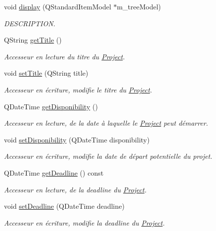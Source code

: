 \begin{DoxyCompactItemize}
void \hyperlink{class_project_abaf715709bc3997c7bee420be44ce608}{display} (Q\+Standard\+Item\+Model $\ast$m\+\_\+tree\+Model)
\begin{DoxyCompactList}\small\item\em D\+E\+S\+C\+R\+I\+P\+T\+I\+O\+N. \end{DoxyCompactList}\item 
Q\+String \hyperlink{class_project_aa11a1dc3fe61d16c85badf19c0fe8396}{get\+Title} ()
\begin{DoxyCompactList}\small\item\em Accesseur en lecture du titre du \hyperlink{class_project}{Project}. \end{DoxyCompactList}\item 
void \hyperlink{class_project_a486fbd3e4fabb0d7cfce9ed95e729dbd}{set\+Title} (Q\+String title)
\begin{DoxyCompactList}\small\item\em Accesseur en écriture, modifie le titre du \hyperlink{class_project}{Project}. \end{DoxyCompactList}\item 
Q\+Date\+Time \hyperlink{class_project_a68a1bfa7c0a4d88c4b5a4aad8d72ee66}{get\+Disponibility} ()
\begin{DoxyCompactList}\small\item\em Accesseur en lecture, de la date à laquelle le \hyperlink{class_project}{Project} peut démarrer. \end{DoxyCompactList}\item 
void \hyperlink{class_project_abe64d8cace31b87207b97dee02933379}{set\+Disponibility} (Q\+Date\+Time disponibility)
\begin{DoxyCompactList}\small\item\em Accesseur en écriture, modifie la date de départ potentielle du projet. \end{DoxyCompactList}\item 
Q\+Date\+Time \hyperlink{class_project_a9d0cd16774bac90f658203334a6ffdae}{get\+Deadline} () const 
\begin{DoxyCompactList}\small\item\em Accesseur en lecture, de la deadline du \hyperlink{class_project}{Project}. \end{DoxyCompactList}\item 
void \hyperlink{class_project_a0667ab9501284b798a0b4ee68f38729f}{set\+Deadline} (Q\+Date\+Time deadline)
\begin{DoxyCompactList}\small\item\em Accesseur en écriture, modifie la deadline du \hyperlink{class_project}{Project}. \end{DoxyCompactList}\item 

\end{DoxyCompactItemize}
